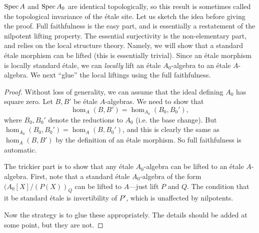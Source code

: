 $\operatorname{Spec} A$ and $\operatorname{Spec} A_0$ are identical topologically, so this result is
sometimes called the topological invariance of the \'etale site.
Let us sketch the idea before giving the proof. Full faithfulness is the easy
part, and is essentially a restatement of the nilpotent lifting property.
The essential surjectivity is the non-elementary part, and relies on the local
structure theory. Namely, we will show that a standard \'etale morphism can be
lifted (this is essentially trivial). Since an \'etale morphism is locally
standard \'etale, we can \emph{locally} lift an \'etale $A_0$-algebra to an
\'etale $A$-algebra. 
We next ``glue'' the local liftings using the full faithfulness.
\begin{proof} Without loss of generality, we can assume that the ideal defining
$A_0$ has square zero.
Let $B, B'$ be \'etale $A$-algebras. We need to show that
\[ \hom_A(B, B') = \hom_{A_0}(B_0, B_0'),  \]
where $B_0, B_0'$ denote the reductions to $A_0$ (i.e. the base change).
But $\hom_{A_0}(B_0, B_0') = \hom_{A}(B, B_0')$, and this is clearly the same
as $\hom_A(B, B')$ by the definition of an \'etale morphism. So full
faithfulness is automatic.

The trickier part is to show that any \'etale $A_0$-algebra can be lifted 
to an \'etale $A$-algebra.
First, note that  a standard \'etale $A_0$-algebra of the form
$(A_0[X]/(P(X))_{Q}$ can be lifted to $A$---just lift $P$ and $Q$. The condition
that it be standard \'etale is invertibility of $P'$, which is unaffected by
nilpotents.

Now the strategy is to glue these appropriately.
The details should be added at some point, but they are not. 
\end{proof} 



